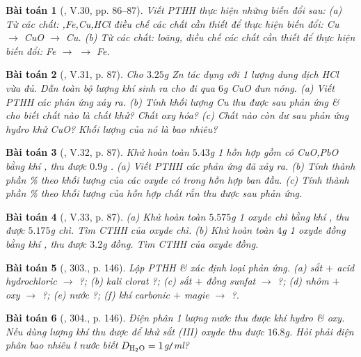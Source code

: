 \documentclass{article}
\newtheorem{baitoan}{Bài toán}
\begin{document}
\begin{baitoan}[\cite{Truong_BTNC_Hoa_Hoc_8_2022}, V.30, pp. 86--87]
	Viết PTHH thực hiện những biến đổi sau: (a) Từ các chất: \emph{,Fe,Cu,HCl} điều chế các chất cần thiết để thực hiện biến đổi: \emph{Cu $\to$ CuO $\to$ Cu}. (b) Từ các chất: \emph{} loãng, điều chế các chất cần thiết để thực hiện biến đổi: \emph{Fe $\to$  $\to$ Fe}.
\end{baitoan}

\begin{baitoan}[\cite{Truong_BTNC_Hoa_Hoc_8_2022}, V.31, p. 87]
	Cho $3.25$\emph{g Zn} tác dụng với 1 lượng dung dịch \emph{HCl} vừa đủ. Dẫn toàn bộ lượng khí sinh ra cho đi qua $6$\emph{g CuO} đun nóng. (a) Viết PTHH các phản ứng xảy ra. (b) Tính khối lượng \emph{Cu} thu được sau phản ứng \& cho biết chất nào là chất khử? Chất oxy hóa? (c) Chất nào còn dư sau phản ứng hydro khử \emph{CuO}? Khối lượng của nó là bao nhiêu?
\end{baitoan}

\begin{baitoan}[\cite{Truong_BTNC_Hoa_Hoc_8_2022}, V.32, p. 87]
	Khử hoàn toàn $5.43$\emph{g} 1 hỗn hợp gồm có \emph{CuO,PbO} bằng khí \emph{}, thu được $0.9$\emph{g }. (a) Viết PTHH các phản ứng đã xảy ra. (b) Tính thành phần \% theo khối lượng của các oxyde có trong hỗn hợp ban đầu. (c) Tính thành phần \% theo khối lượng của hỗn hợp chất rắn thu được sau phản ứng.
\end{baitoan}

\begin{baitoan}[\cite{Truong_BTNC_Hoa_Hoc_8_2022}, V.33, p. 87]
	(a) Khử hoàn toàn $5.575$\emph{g} 1 oxyde chì bằng khí \emph{}, thu được $5.175$\emph{g} chì. Tìm CTHH của oxyde chì. (b) Khử hoàn toàn $4$\emph{g} 1 oxyde đồng bằng khí \emph{}, thu được $3.2$\emph{g} đồng. Tìm CTHH của oxyde đồng.
\end{baitoan}

\begin{baitoan}[\cite{An_400_BT_Hoa_Hoc_8_2020}, 303., p. 146]
	Lập PTHH \& xác định loại phản ứng. (a) sắt $+$ acid hydrochloric $\to$ ?; (b) kali clorat \ce{->[$t^\circ$]} ?; (c) sắt $+$ đồng sunfat $\to$ ?; (d) nhôm $+$ oxy $\to$ ?; (e) nước  ?; (f) khí carbonic $+$ magie $\to$ ?.
\end{baitoan}

\begin{baitoan}[\cite{An_400_BT_Hoa_Hoc_8_2020}, 304., p. 146]
	Điện phân 1 lượng nước thu được khí hydro \& oxy. Nếu dùng lượng khí \emph{} thu được để khử sắt (III) oxyde thu được $16.8$\emph{g}. Hỏi phải điện phân bao nhiêu \emph{l} nước biết $D_{\ce{H2O}} = 1$\emph{g\texttt{/}ml}?
\end{baitoan}
\end{document}
